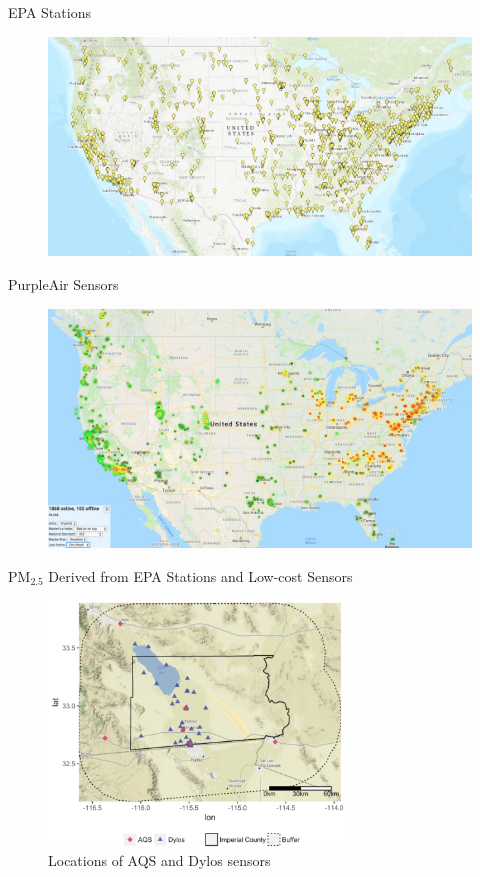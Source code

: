 \documentclass{beamer}
\begin{document}
\begin{frame}{EPA Stations}
    \begin{figure}
        \centering
        \includegraphics[width=\textwidth]{img/appendix/Aim2/Stations/epa.jpg}
    \end{figure}
\end{frame}

\begin{frame}{PurpleAir Sensors}
    \begin{figure}
        \centering
        \includegraphics[width=\textwidth]{img/appendix/Aim2/Stations/purpleair.jpg}
    \end{figure}
\end{frame}

\begin{frame}{PM$_{2.5}$ Derived from EPA Stations and Low-cost Sensors}
    \begin{figure}
        \centering
        \includegraphics[width=0.7\textwidth]{img/appendix/Aim2/im_location.png}
        \caption{Locations of AQS and Dylos sensors}
    \end{figure}
\end{frame}
\end{document}
